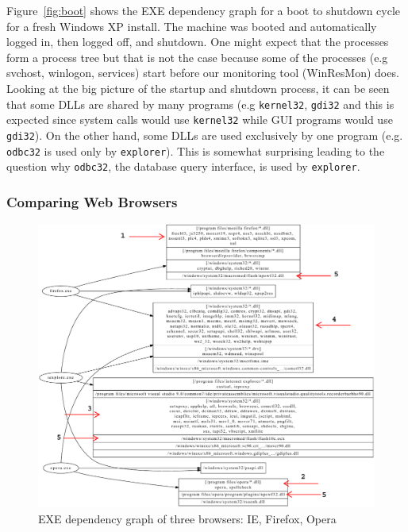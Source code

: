 Figure~\ref{fig:boot} shows the EXE dependency graph for a boot to shutdown cycle
for a fresh Windows XP install.
The machine was booted and automatically logged in,
then logged off, and shutdown. One might expect that the processes
form a process tree but that is not the case because some of the processes (e.g
svchost, winlogon, services) start before our monitoring tool
(WinResMon) does. Looking at the big picture of the startup and shutdown
process, it can be seen that some DLLs are shared by many programs (e.g
{\tt kernel32}, {\tt gdi32} and this is expected since system calls would use
{\tt kernel32} while GUI programs would use {\tt gdi32}).
On the other hand, some DLLs are used exclusively by one program (e.g.
{\tt odbc32} is used only by {\tt explorer}).
This is somewhat surprising leading to the question why {\tt odbc32},
the database query interface, is used by {\tt explorer}.

\subsubsection{Comparing Web Browsers}

\begin{figure}[bthp]
\centering
\includegraphics[width=1.0\textwidth]{depvis/browsers-group-annot.pdf}
\caption{EXE dependency graph of three browsers: IE, Firefox, Opera}
\label{fig:browsers}
\end{figure}

